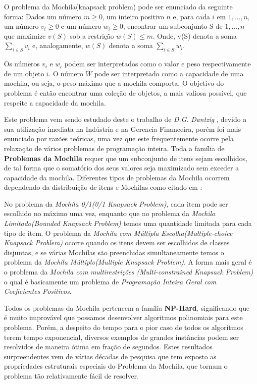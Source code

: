 \documentclass[a4paper, 12pt]{article}
\begin{document}
O problema da Mochila(knapsack problem) pode ser enunciado da seguinte forma:
Dados um número $m \geq 0$, um inteiro positivo $n$ e, para cada $i$ em ${1, . . . , n}$, um
número $v_i \geq 0$ e um número $w_i \geq 0$, encontrar um subconjunto S de ${1, . . . , n}$ que
maximize $v(S)$ sob a restrição $w(S)\leq m$. Onde, v(S) denota a soma $\sum_{ i \in S} v_i$ e, 
analogamente, $w(S)$ denota a soma $\sum_{ i \in S} w_i$.

Os números $v_i$ e $w_i$ podem ser interpretados como o valor e peso respectivamente
de um objeto $i$. O número $W$ pode ser interpretado como a capacidade de uma
mochila, ou seja, o peso máximo que a mochila comporta. O objetivo do problema
é então encontrar uma coleção de objetos, a mais valiosa possível, que respeite a
capacidade da mochila.

Este problema vem sendo estudado deste o trabalho de \textit{D.G. Dantzig} \cite{pisinger1995algorithms}, devido a
sua utilização imediata na Indústria e na Gerencia Financeira, porém foi mais enunciado por razões teóricas, 
uma vez que este frequentemente ocorre pela relaxação de vários problemas de programação inteira. 
Toda a família de \textbf{Problemas da Mochila} requer que um subconjunto de itens sejam escolhidos, de tal forma que o
somatório dos seus valores seja maximizado sem exceder a capacidade da mochila.
Diferentes tipos de problemas da Mochila ocorrem dependendo da distribuição de
itens e Mochilas como citado em \cite{pisinger1995algorithms}:

No problema da \textit{Mochila 0/1(0/1 Knapsack Problem)}, cada item pode ser escolhido no máximo uma vez, 
enquanto que no problema da \textit{Mochila Limitado(Bounded Knapsack Problem)} temos uma quantidade limitada 
para cada tipo de item. O problema da \textit{Mochila com Múltipla Escolha(Multiple-choice Knapsack Problem)}
ocorre quando os itens devem ser escolhidos de classes disjuntas, e se várias Mochilas são preenchidas 
simultaneamente temos o problema da \textit{Mochila Múltiplo(Multiple Knapsack Problem)}. 
A forma mais geral é o problema da \textit{Mochila com multirestrições (Multi-constrained Knapsack Problem)} 
o qual é basicamente um problema de \textit{Programação Inteira Geral com Coeficientes Positivos}.

Todos os problemas da Mochila pertencem a família \textbf{NP-Hard}\cite{pisinger1995algorithms}, significando que
é muito improvável que possamos desenvolver algoritmos polinomiais para este problema. Porém, a 
despeito do tempo para o pior caso de todos os algoritmos terem tempo exponencial, diversos exemplos 
de grandes instâncias podem ser resolvidos de maneira ótima em fração de segundos. 
Estes resultados surpreendentes vem de várias décadas de pesquisa que tem exposto as propriedades 
estruturais especiais do Problema da Mochila, que tornam o problema tão relativamente fácil de resolver.
\end{document}
